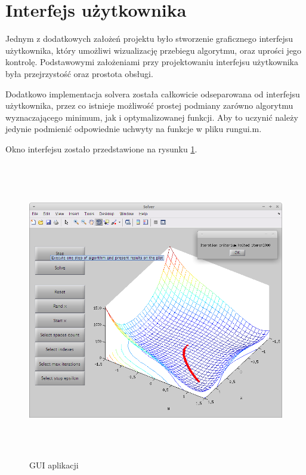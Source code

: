 \documentclass[12pt]{article}
\begin{document}
\section*{Interfejs użytkownika}

Jednym z dodatkowych założeń projektu było stworzenie graficznego interfejsu
użytkownika, który umożliwi wizualizację przebiegu algorytmu, oraz uprości jego
kontrolę. Podstawowymi założeniami przy projektowaniu interfejsu użytkownika
była przejrzystość oraz prostota obsługi.

Dodatkowo implementacja solvera została całkowicie odseparowana od interfejsu
użytkownika, przez co istnieje możliwość prostej podmiany zarówno algorytmu
wyznaczającego minimum, jak i optymalizowanej funkcji. Aby to uczynić należy
jedynie podmienić odpowiednie uchwyty na funkcje w pliku rungui.m.

Okno interfejsu zostało przedstawione na rysunku \ref{img:gui1}.

\begin{figure}[!htb]
    \begin{center}
        \includegraphics[height=13cm]{../res/img/gui_snap_solve.png}
    \end{center}
    \caption{GUI aplikacji}\label{img:gui1}
\end{figure}

\newpage
\end{document}
